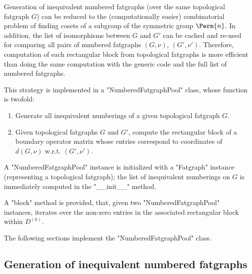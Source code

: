 Generation of inequivalent numbered fatgraphs (over the same
topological fatgraph $G$) can be reduced to the (computationally
easier) combinatorial problem of finding cosets of a subgroup of the
symmetric group $\Perm{n}$.  In addition, the list of isomorphisms
between $G$ and $G'$ can be cached and re-used for comparing all pairs
of numbered fatgraphs $(G,\nu)$, $(G',\nu')$.  Therefore, computation
of each rectangular block from topological fatgraphs is more efficient
than doing the same computation with the generic code and the full
list of numbered fatgraphs.

This strategy is implemented in a "NumberedFatgraphPool" class, whose
function is twofold:
\begin{enumerate}
\item\label{nfp:1} Generate all inequivalent numberings of a given
  topological fatgraph $G$.
\item\label{nfp:2} Given topological fatgraphs $G$ and $G'$, compute
  the rectangular block of a boundary operator matrix whose entries
  correspond to coordinates of $d(G,\nu)$ w.r.t. $(G',\nu')$.
\end{enumerate}

A "NumberedFatgraphPool" instance is initialized with a "Fatgraph"
instance (representing a topological fatgraph); the list of inequivalent
numberings on $G$ is immediately computed in the "__init__" method.

A "block" method is provided, that, given two "NumberedFatgraphPool"
instances, iterates over the non-zero entries in the associated
rectangular block within $D^{(k)}$.

The following sections implement the "NumberedFatgraphPool" class.


\subsection{Generation of inequivalent numbered fatgraphs}
\label{sec:numberings}


